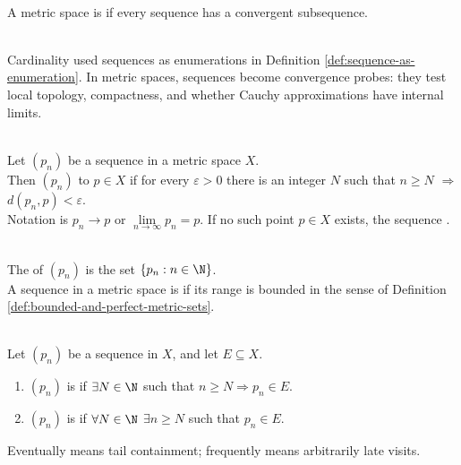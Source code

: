\begin{definition} \label{def:sequentially-compact-metric-space} \\
A metric space is  if every sequence has a convergent subsequence.
\end{definition}

\begin{perspective} \label{per:metric-sequences-as-topological-tests} \\
Cardinality used sequences as enumerations in Definition \ref{def:sequence-as-enumeration}. In metric spaces, sequences become convergence probes: they test local topology, compactness, and whether Cauchy approximations have internal limits.
\end{perspective}

\begin{definition} \label{def:sequence-convergence-metric}\label{def:sequences-core-definitions-source-todo} \\
Let $(p_n)$ be a sequence in a metric space $X$.\\
Then $(p_n)$  to $p\in X$ if for every $\varepsilon>0$ there is an integer $N$ such that $n\geq N$ $\Longrightarrow$ $d(p_n,p)<\varepsilon$.\\
Notation is $p_n\to p$ or $\lim\limits_{n\to\infty}p_n=p$. If no such point $p\in X$ exists, the sequence .
\end{definition}

\begin{definition} \label{def:sequence-range-and-boundedness} \\
The  of $(p_n)$ is the set $\{p_n:n\in\N\}$.\\
A sequence in a metric space is  if its range is bounded in the sense of Definition \ref{def:bounded-and-perfect-metric-sets}.
\end{definition}

\begin{definition} \label{def:eventually-and-frequently-in-a-set} \\
Let $(p_n)$ be a sequence in $X$, and let $E\subseteq X$.
\begin{enumerate}[label=(\roman*)]
\setlength{\itemsep}{0pt}
\item $(p_n)$ is  if $\exists N\in\N$ such that $n\geq N\Longrightarrow p_n\in E$.
\item $(p_n)$ is  if $\forall N\in\N$ $\exists n\geq N$ such that $p_n\in E$.
\end{enumerate}
Eventually means tail containment; frequently means arbitrarily late visits.
\end{definition}

